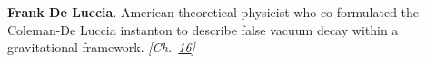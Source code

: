 \textbf{Frank De Luccia}. American theoretical physicist who co-formulated the Coleman-De Luccia instanton to describe false vacuum decay within a gravitational framework. \emph{[Ch.~\hyperref[ch:falsevacuumthreat]{16}]}

